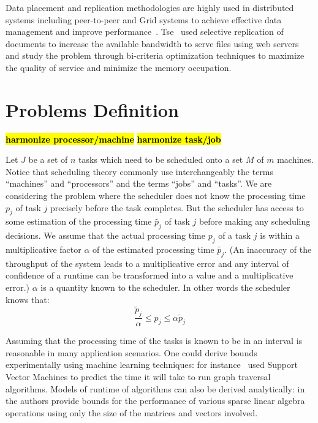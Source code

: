 \documentclass[twocolumn]{svjour3}
\newcommand{\todo}[1]{{\color{red}\textbf{\hl{#1}}\xspace}}
\begin{document}
Data placement and replication methodologies are highly used in
distributed systems including peer-to-peer and Grid systems to achieve
effective data management and improve
performance~\cite{Cirne2007213,Abawajy,4215379}. Tse~\cite{DBLP:journals/tc/Tse12}
used selective replication of documents to increase the available
bandwidth to serve files using web servers and study the problem
through bi-criteria optimization techniques to maximize the quality of
service and minimize the memory occupation.


\section{Problems Definition}\label{sec2}
\todo{harmonize processor/machine}
\todo{harmonize task/job}

Let $J$ be a set of $n$ tasks which need to be scheduled onto a set
$M$ of $m$ machines. Notice that scheduling theory commonly use
interchangeably the terms ``machines'' and ``processors'' and the
terms ``jobs'' and ``tasks''. We are considering the problem where the
scheduler does not know the processing time $p_j$ of task $j$
precisely before the task completes.  But the scheduler has access to
some estimation of the processing time $\tilde{p_j}$ of task $j$
before making any scheduling decisions. We assume that the actual
processing time $p_j$ of a task $j$ is within a multiplicative factor
$\alpha$ of the estimated processing time $\tilde{p_j}$. (An
inaccuracy of the throughput of the system leads to a multiplicative
error and any interval of confidence of a runtime can be transformed
into a value and a multiplicative error.) $\alpha$ is a quantity known
to the scheduler. In other words the scheduler knows that:
 \begin{equation}\label{eq1}
\frac{\tilde{p}_{j}}{\alpha}\leq p_{j}\leq \alpha \tilde{p}_{j}
\end{equation}

Assuming that the processing time of the tasks is known to be in an
interval is reasonable in many application scenarios. One could derive
bounds experimentally using machine learning techniques: for
instance~\cite{You14-ICPP} used Support Vector Machines to predict the
time it will take to run graph traversal algorithms. Models of runtime
of algorithms can also be derived analytically:
in~\cite{Erlebacher14-ICS} the authors provide bounds for the
performance of various sparse linear algebra operations using only the
size of the matrices and vectors involved.
\end{document}
